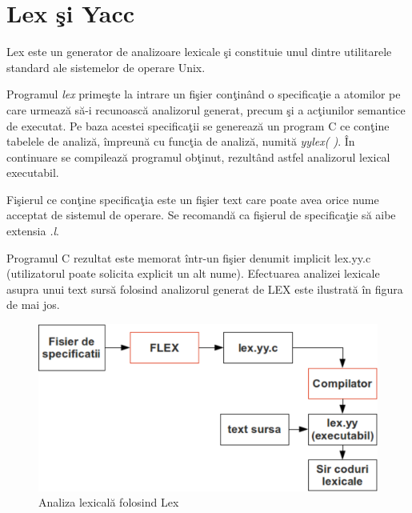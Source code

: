 
\chapter{Lex \c{s}i Yacc} %
\label{Capitolul3}

Lex este un generator de analizoare lexicale \c{s}i constituie unul dintre utilitarele standard ale sistemelor de operare Unix.

Programul \emph{lex} prime\c{s}te la intrare un fi\c{s}ier con\c{t}in\^{a}nd o specifica\c{t}ie a atomilor pe care urmeaz\u{a} s\u{a}-i recunoasc\u{a} analizorul generat, precum \c{s}i a ac\c{t}iunilor semantice de executat. Pe baza acestei specifica\c{t}ii se genereaz\u{a} un program C ce con\c{t}ine tabelele de analiz\u{a}, \^{i}mpreun\u{a} cu func\c{t}ia de analiz\u{a}, numit\u{a} \emph{yylex( )}. \^{I}n continuare se compileaz\u{a} programul ob\c{t}inut, rezult\^{a}nd astfel analizorul lexical executabil. 

Fi\c{s}ierul ce con\c{t}ine specifica\c{t}ia este un fi\c{s}ier text care poate avea orice nume acceptat de sistemul de operare. Se recomand\u{a} ca fi\c{s}ierul de specifica\c{t}ie s\u{a} aibe extensia \emph{.l}.

Programul C rezultat este memorat \^{i}ntr-un fi\c{s}ier denumit implicit lex.yy.c (utilizatorul poate solicita explicit un alt nume).  Efectuarea analizei lexicale asupra unui text surs\u{a} folosind analizorul generat de LEX este ilustrat\u{a} \^{i}n figura de mai jos.

\begin{figure}[htp]
 \centering
 \includegraphics[scale=0.6]{Figuri/flex.eps}
 \caption{Analiza lexical\u{a} folosind Lex}
 \label{figflex}
\end{figure}

